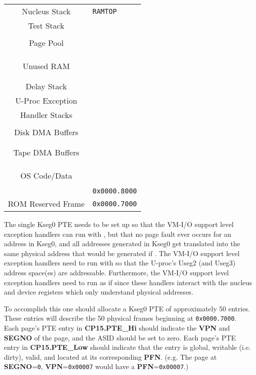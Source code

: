 \begin{center}
\begin{tabular}{|c|l}
\cline{1-1}
Nucleus Stack & \texttt{RAMTOP} \\
\cline{1-1}
Test Stack \\
\cline{1-1}
\\
Page Pool\\
\\
\cline{1-1}
\\
\\
Unused RAM\\
\\
\\
\cline{1-1}
Delay Stack\\
\cline{1-1}
U-Proc Exception\\
Handler Stacks\\
\cline{1-1}
\\
Disk DMA Buffers\\
\\
\cline{1-1}
\\
Tape DMA Buffers\\
\\
\cline{1-1}
\\
\\
OS Code/Data\\
\\
& \texttt{0x0000.8000}\\
\cline{1-1}
ROM Reserved Frame & \texttt{0x0000.7000}\\
\cline{1-1}
\end{tabular}
\end{center}

The single Kseg0 PTE needs to be set up so that the VM-I/O support level exception handlers can run with \vmon{}, but that no page fault ever occurs for an address in Kseg0, and all addresses generated in Kseg0 get translated into the same physical address that would be generated if \vmoff{}. 
The VM-I/O support level exception handlers need to run with \vmon{} so that the U-proc's Useg2 (and Useg3) address space(es) are addressable. 
Furthermore, the VM-I/O support level exception handlers need to run as if\linebreak \vmoff{} since these handlers interact with the nucleus and device registers which only understand physical addresses.

To accomplish this one should allocate a Kseg0 PTE of approximately 50 entries.
These entries will describe the 50 physical frames beginning at \texttt{0x0000.7000}.
Each page's PTE entry in \textbf{CP15.PTE\_Hi} should indicate the \textbf{VPN} and \textbf{SEGNO} of the page, and the ASID should be set to zero. 
Each page's PTE entry in \textbf{CP15.PTE\_Low} should indicate that the entry is global, writable (i.e. dirty), valid, and located at its corresponding \textbf{PFN}. (e.g. The page at \textbf{SEGNO}=\texttt{0}, \textbf{VPN}=\texttt{0x00007} would have a \textbf{PFN}=\texttt{0x00007}.)

